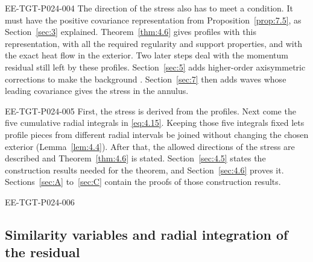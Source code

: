 \begin{EESegment}{EE-TGT-P024-004}
The direction of the stress also has to meet a condition. It must have the positive covariance
representation from Proposition~\ref{prop:7.5}, as Section~\ref{sec:3} explained.
Theorem~\ref{thm:4.6} gives profiles with this representation, with all the required
regularity and support properties, and with the exact heat flow in the exterior. Two later
steps deal with the momentum residual still left by these profiles. Section~\ref{sec:5} adds
higher-order axisymmetric corrections to make the background
. Section~\ref{sec:7} then adds waves whose leading covariance
gives the stress in the annulus.
\end{EESegment}

\begin{EESegment}{EE-TGT-P024-005}
First, the stress is derived from the profiles. Next come the five cumulative radial
integrals in \eqref{eq:4.15}. Keeping those five integrals fixed lets profile pieces from
different radial intervals be joined without changing the chosen exterior
(Lemma~\ref{lem:4.4}). After that, the allowed directions of the stress are described and
Theorem~\ref{thm:4.6} is stated. Section~\ref{sec:4.5} states the construction results needed
for the theorem, and Section~\ref{sec:4.6} proves it. Sections~\ref{sec:A} to~\ref{sec:C}
contain the proofs of those construction results.
\end{EESegment}

\begin{EESegment}{EE-TGT-P024-006}
\subsection{Similarity variables and radial integration of the residual}
\label{sec:4.1}
\end{EESegment}


